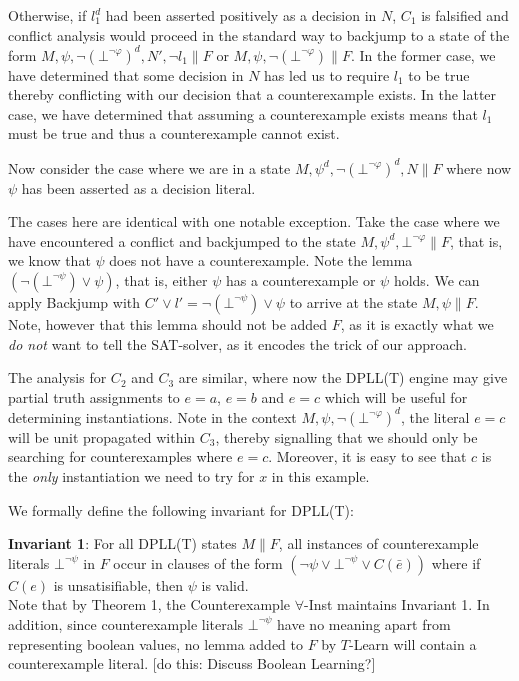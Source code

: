 \documentclass{llncs}
\begin{document}
Otherwise, if $l_1^d$ had been asserted positively as a decision in $N$, $C_1$ is falsified and conflict analysis would proceed in the standard way to backjump to a state of the form $M, \psi, \neg( \bot^{\neg \varphi} )^d, N', \neg l_1 \parallel F$ or $M, \psi, \neg( \bot^{\neg \varphi} )  \parallel F$.
In the former case, we have determined that some decision in $N$ has led us to require $l_1$ to be true thereby conflicting with our decision that a counterexample exists.
In the latter case, we have determined that assuming a counterexample exists means that $l_1$ must be true and thus a counterexample cannot exist.

Now consider the case where we are in a state $M, \psi^d, \neg( \bot^{\neg \varphi} )^d, N  \parallel F$ where now $\psi$ has been asserted as a decision literal.

The cases here are identical with one notable exception.
Take the case where we have encountered a conflict and backjumped to the state $M, \psi^d, \bot^{\neg \varphi} \parallel F$, that is, we know that $\psi$ does not have a counterexample.
Note the lemma $(\neg (\bot^{\neg \psi}) \vee \psi)$, that is, either $\psi$ has a counterexample or $\psi$ holds.
We can apply Backjump with $C' \vee l' = \neg (\bot^{\neg \psi}) \vee \psi$ to arrive at the state $M, \psi \parallel F$.
Note, however that this lemma should not be added $F$, as it is exactly what we \emph{do not} want to tell the SAT-solver, as it encodes the trick of our approach.

The analysis for $C_2$ and $C_3$ are similar, where now the DPLL(T) engine may give partial truth assignments to $e = a$, $e = b$ and $e = c$ which will be useful for determining instantiations.
Note in the context $M, \psi, \neg( \bot^{\neg \varphi} )^d$, the literal $e = c$ will be unit propagated within $C_3$, thereby signalling that we should only be searching for counterexamples where $e = c$.
Moreover, it is easy to see that $c$ is the \emph{only} instantiation we need to try for $x$ in this example.

We formally define the following invariant for DPLL(T):

{\bf Invariant 1}:
For all DPLL(T) states $M \parallel F$, all instances of counterexample literals $\bot^{\neg \psi}$ in $F$ occur in clauses of the form $( \neg \psi \vee \bot^{\neg \psi} \vee C(\bar{e}) )$ where if $C(e)$ is unsatisifiable, then $\psi$ is valid. \\

Note that by Theorem 1, the Counterexample $\forall$-Inst maintains Invariant 1.
In addition, since counterexample literals $\bot^{ \neg \psi }$ have no meaning apart from representing boolean values, no lemma added to $F$ by $T$-Learn will contain a counterexample literal.
[do this: Discuss Boolean Learning?]
\end{document}
